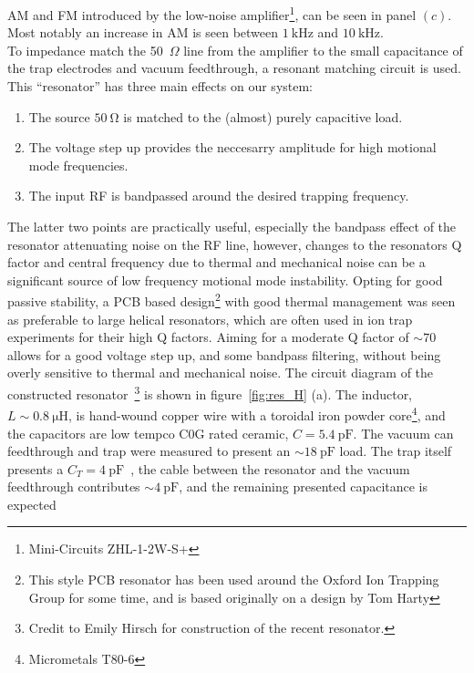     AM and FM introduced by the low-noise amplifier\footnote{Mini-Circuits ZHL-1-2W-S+}, can be seen in panel $(c)$. Most notably an increase in AM is seen between $1~\unit{\kilo\hertz}$ and $10~\unit{\kilo\hertz}$.\\
    To impedance match the 50~$\Omega$ line from the amplifier to
    the small capacitance  of the trap electrodes and vacuum feedthrough, a resonant 
    matching circuit is used.
    This ``resonator'' has three main effects on our system:
    \begin{enumerate}
    \item The source $50~\unit{\ohm}$ is matched to the (almost) purely capacitive load.
    \item The voltage step up provides the neccesarry amplitude for high motional mode frequencies.
    \item The input RF is bandpassed around the desired trapping frequency.
    \end{enumerate}
    The latter two points are practically useful, especially the bandpass effect
    of the resonator attenuating noise on the RF line, however, changes to the
    resonators Q factor and central frequency due to thermal and mechanical
    noise can be a significant source of low frequency motional mode
    instability. Opting for good passive stability, a PCB based design\footnote{This style
    PCB resonator has been used around the Oxford Ion Trapping Group for some
    time, and is based originally on a design by Tom Harty} with good thermal
    management was seen as preferable to large helical resonators, which are
    often used in ion trap experiments for their high Q factors.
    Aiming for a
    moderate Q factor of $\sim 70$ allows for a good voltage step up, and some
    bandpass filtering, without being overly sensitive to thermal and mechanical
    noise.  
    The circuit diagram of the constructed resonator~\footnote{Credit to Emily
    Hirsch for construction of the recent resonator.} is shown in
    figure~\ref{fig:res_H} (a). The inductor, $L\sim 0.8~\unit{\micro\henry}$, is hand-wound copper wire with a toroidal iron powder core\footnote{Micrometals T80-6}, and the capacitors are low tempco C0G rated ceramic, $C=5.4~\unit{\pico\farad}$.
    The vacuum can
    feedthrough and trap were measured to present an $\sim
    18~\unit{\pico\farad}$ load. The trap itself presents a
    $C_T=4~\unit{\pico\farad}$~\cite{wilpers_compact_2013}, the cable between the
    resonator and the vacuum feedthrough contributes $\sim
    4~\unit{\pico\farad}$, and the remaining presented capacitance is expected
